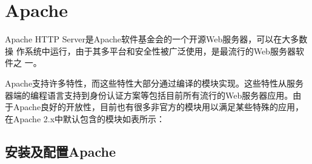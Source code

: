 \section{Apache}
\label{sec:apache}

Apache HTTP Server是Apache软件基金会的一个开源Web服务器，可以在大多数操
作系统中运行，由于其多平台和安全性被广泛使用，是最流行的Web服务器软件之
一。

Apache支持许多特性，而这些特性大部分通过编译的模块实现。这些特性从服务
器端的编程语言支持到身份认证方案等包括目前所有流行的Web服务器应用。由
于Apache良好的开放性，目前也有很多非官方的模块用以满足某些特殊的应用，
在Apache 2.x中默认包含的模块如表所示：

\subsection{安装及配置Apache}
\label{subsec:InstallApache}

